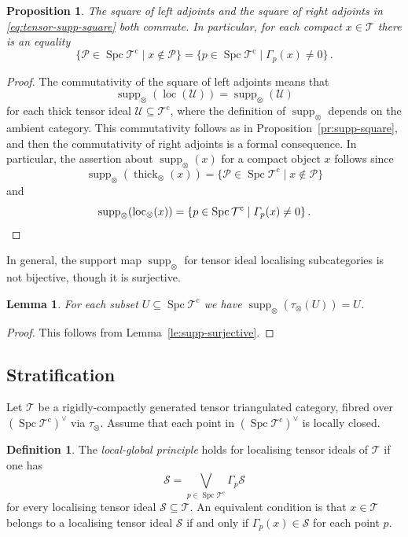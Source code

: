 \documentclass{amsart}[a4]
\newtheorem{lemma}[theorem]{Lemma}
\newtheorem{proposition}[theorem]{Proposition}
\theoremstyle{definition}
\newtheorem{definition}[theorem]{Definition}
\theoremstyle{remark}
\numberwithin{equation}{section}
\newcommand{\loc}{\operatorname{loc}}
\newcommand{\Spc}{\operatorname{Spc}}
\newcommand{\supp}{\operatorname{supp}}
\newcommand{\thick}{\operatorname{thick}}
\newcommand{\cat}{\mathcal}
\let\Gamma\varGamma
\begin{document}
\begin{proposition}
The square of left adjoints and the square of right
adjoints in \eqref{eq:tensor-supp-square} both commute.
In particular, for each compact $x\in\cat T$ there is an equality
\[\{\cat P\in \Spc\cat T^{\mathrm c}\mid x\not\in\cat P\}=\{p\in \Spc\cat T^{\mathrm c}\mid\Gamma_p(x)\neq
  0\}\,.\]
\end{proposition}
\begin{proof}
  The commutativity of the square of left adjoints means that
  \[\supp_\otimes(\loc(\cat U))=\supp_\otimes(\cat U)\] for each thick
  tensor ideal $\cat U\subseteq\cat T^{\mathrm c}$, where the definition of
  $\supp_\otimes$ depends on the ambient category. This commutativity
  follows as in Proposition~\ref{pr:supp-square}, and then the
  commutativity of right adjoints is a formal consequence. In
  particular, the assertion about $\supp_\otimes(x)$ for a compact
  object $x$ follows since
  \[\supp_\otimes(\thick_\otimes(x)) =\{\cat P\in \Spc\cat T^{\mathrm c}\mid
    x\not\in\cat P\}\]
  and
\[\supp_\otimes(\loc_\otimes(x))=\{p\in \Spc\cat T^{\mathrm c}\mid\Gamma_p(x)\neq
  0\}\,.\qedhere\]
\end{proof}

In general, the support map $\supp_\otimes$ for tensor ideal
localising subcategories is not bijective, though it is surjective.

\begin{lemma}\label{le:tensor-supp-surjective}
  For each subset $U\subseteq \Spc\cat T^{\mathrm c}$ we have
  $\supp_\otimes(\tau_\otimes(U))=U$.
\end{lemma}
\begin{proof}
  This follows from Lemma~\ref{le:supp-surjective}.
\end{proof}  



\subsection*{Stratification}

Let $\cat T$ be a rigidly-compactly generated tensor triangulated
category, fibred over $(\Spc\cat T^{\mathrm c})^\vee$ via $\tau_\otimes$. Assume
that each point in $(\Spc\cat T^{\mathrm c})^\vee$ is locally closed.

\begin{definition}
The \emph{local-global principle} holds for localising tensor ideals of $\cat
T$ if one has
\[\cat S=\bigvee_{p\in\Spc\cat T^{\mathrm c}}\Gamma_p\cat S\]
for every localising tensor ideal $\cat S\subseteq \cat T$.
An equivalent condition is that $x\in\cat T$ belongs to a localising
tensor ideal $\cat S$ if
and only if $\Gamma_p(x)\in\cat S$ for each point $p$.
\end{definition}
\end{document}

